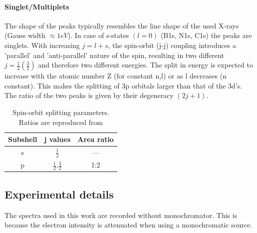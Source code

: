 \paragraph{Singlet/Multiplets}
The shape of the peaks typically resembles the line shape of the used X-rays (Gauss width $\approx 1eV$). In case of s-states $(l=0)$ (B1s, N1s, C1s) the peaks are singlets. With increasing $j=l+s$, the spin-orbit (j-j) coupling introduces a 'parallel' and 'anti-parallel' nature of the spin, resulting in two different $j=\frac{1}{2}(\frac{3}{2})$ and therefore two different energies. The split in energy is expected to increase with the atomic number Z (for constant n,l) or as l decreases (n constant). This makes the splitting of 3p orbitals larger than that of the 3d's. The ratio of the two peaks is given by their degeneracy $(2j+1)$.\cite[113]{Riviere_90}
\begin{table}
\caption{Spin-orbit splitting parameters. Ratios are reproduced from \cite{Riviere_90}}
\centering
 \begin{tabular}{ccc}
 Subshell & j values & Area ratio \\ \hline
 s & $\frac{1}{2}$ & --- \\
 p & $\frac{1}{2}$,$\frac{3}{2}$ & 1:2 \\
 \end{tabular}
\end{table}

%

\subsection{Experimental details}
The spectra used in this work are recorded without monochromator. This is because the electron intensity is attenuated when using a monochromatic source.


